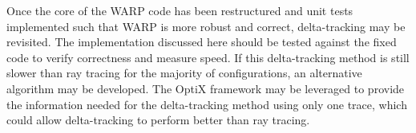 Once the core of the WARP code has been restructured and unit tests implemented such that WARP is more
robust and correct, delta-tracking may be revisited. The implementation discussed here should be tested
against the fixed code to verify correctness and measure speed. If this delta-tracking method is still
slower than ray tracing for the majority of configurations, an alternative algorithm may be developed. 
The OptiX framework may be leveraged to provide the information needed for the delta-tracking method
using only one trace, which could allow delta-tracking to perform better than ray tracing.

